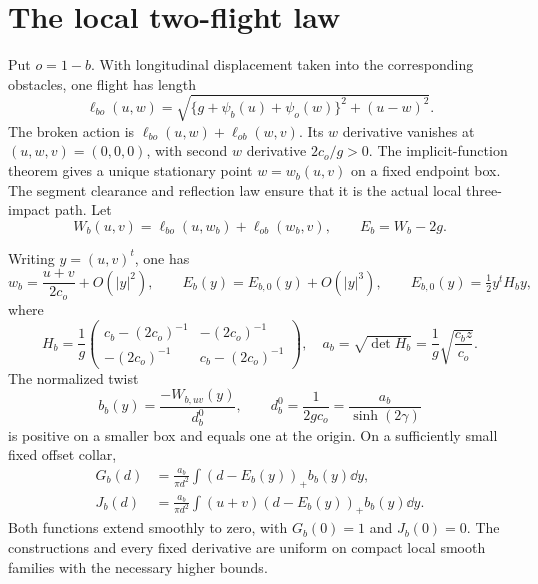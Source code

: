 \section{The local two-flight law}
\label{sec:local}
Put $o=1-b$. With longitudinal displacement taken into the corresponding
obstacles, one flight has length
\[
 \ell_{bo}(u,w)=
 \sqrt{\{g+\psi_b(u)+\psi_o(w)\}^2+(u-w)^2}.
\]
The broken action is
$\ell_{bo}(u,w)+\ell_{ob}(w,v)$. Its $w$ derivative vanishes at
$(u,w,v)=(0,0,0)$, with second $w$ derivative $2c_o/g>0$.
The implicit-function theorem gives a unique stationary point
$w=w_b(u,v)$ on a fixed endpoint box. The segment clearance and
reflection law ensure that it is the actual local three-impact path.
Let
\[
 W_b(u,v)=\ell_{bo}(u,w_b)+\ell_{ob}(w_b,v),\qquad
 E_b=W_b-2g.
\]

\begin{lemma}\label{lem:flux}
Writing $y=(u,v)^t$, one has
\begin{equation}\label{eq:quad}
 w_b=\frac{u+v}{2c_o}+O(|y|^2),\qquad
 E_b(y)=E_{b,0}(y)+O(|y|^3),\qquad
 E_{b,0}(y)=\tfrac12 y^tH_by,
\end{equation}
where
\begin{equation}\label{eq:H}
 H_b=\frac1g
 \begin{pmatrix}c_b-(2c_o)^{-1}&-(2c_o)^{-1}\\
                 -(2c_o)^{-1}&c_b-(2c_o)^{-1}\end{pmatrix},
 \quad a_b=\sqrt{\det H_b}=\frac1g\sqrt{\frac{c_bz}{c_o}}.
\end{equation}
The normalized twist
\begin{equation}\label{eq:twist}
 b_b(y)=\frac{-W_{b,uv}(y)}{d_b^0},\qquad
 d_b^0=\frac1{2gc_o}=\frac{a_b}{\sinh(2\gamma)}
\end{equation}
is positive on a smaller box and equals one at the origin. On a
sufficiently small fixed offset collar,
\begin{align}
 G_b(d)&=\frac{a_b}{\pi d^2}
             \int(d-E_b(y))_+b_b(y)\dd y,\label{eq:Gintegral}\\
 J_b(d)&=\frac{a_b}{\pi d^2}
             \int(u+v)(d-E_b(y))_+b_b(y)\dd y.\label{eq:Jintegral}
\end{align}
Both functions extend smoothly to zero, with $G_b(0)=1$ and
$J_b(0)=0$. The constructions and every fixed derivative are uniform
on compact local smooth families with the necessary higher bounds.
\end{lemma}

